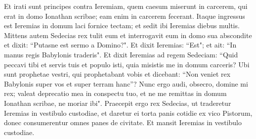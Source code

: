 \begin{biblechapter}
\verse Et irati sunt principes contra Ieremiam, quem caesum miserunt in carcerem, qui erat in domo Ionathan scribae; eam enim in carcerem fecerant. 
\verse Itaque ingressus est Ieremias in domum laci fornice tectam; et sedit ibi Ieremias diebus multis.  
\verse Mittens autem Sedecias rex tulit eum et interrogavit eum in domo sua abscondite et dixit: “Putasne est sermo a Domino?". Et dixit Ieremias: “Est"; et ait: “In manus regis Babylonis traderis". 
\verse Et dixit Ieremias ad regem Sedeciam: “Quid peccavi tibi et servis tuis et populo isti, quia misistis me in domum carceris? 
\verse Ubi sunt prophetae vestri, qui prophetabant vobis et dicebant: “Non veniet rex Babylonis super vos et super terram hanc”? 
\verse Nunc ergo audi, obsecro, domine mi rex; valeat deprecatio mea in conspectu tuo, et ne me remittas in domum Ionathan scribae, ne moriar ibi". 
\verse Praecepit ergo rex Sedecias, ut traderetur Ieremias in vestibulo custodiae, et daretur ei torta panis cotidie ex vico Pistorum, donec consumerentur omnes panes de civitate. Et mansit Ieremias in vestibulo custodiae. 
\end{biblechapter}

